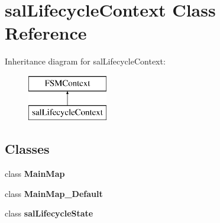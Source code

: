 \hypertarget{classsal_lifecycle_context}{\section{sal\-Lifecycle\-Context Class Reference}
\label{classsal_lifecycle_context}
}
Inheritance diagram for sal\-Lifecycle\-Context\-:\begin{figure}[H]
\begin{center}
\leavevmode
\includegraphics[height=2.000000cm]{classsal_lifecycle_context}
\end{center}
\end{figure}
\subsection*{Classes}
\begin{DoxyCompactItemize}
\item 
class {\bfseries Main\-Map}
\item 
class {\bfseries Main\-Map\-\_\-\-Default}
\item 
class {\bfseries sal\-Lifecycle\-State}
\end{DoxyCompactItemize}
